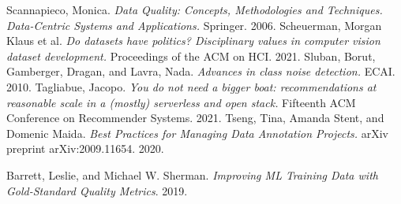 \documentclass[twocolumn]{article}
\begin{document}
\begin{thebibliography}{10}
 Scannapieco, Monica. {\em Data Quality: Concepts, Methodologies and Techniques. Data-Centric Systems and Applications.} Springer. 2006.
 Scheuerman, Morgan Klaus et al. {\em Do datasets have politics? Disciplinary values in computer vision dataset development.} Proceedings of the ACM on HCI. 2021.
 Sluban, Borut, Gamberger, Dragan, and Lavra, Nada. {\em Advances in class noise detection.} ECAI. 2010.
 Tagliabue, Jacopo. {\em You do not need a bigger boat: recommendations at reasonable scale in a (mostly) serverless and open stack.} Fifteenth ACM Conference on Recommender Systems. 2021.
 Tseng, Tina, Amanda Stent, and Domenic Maida. {\em Best Practices for Managing Data Annotation Projects.} arXiv preprint arXiv:2009.11654. 2020.

 Barrett, Leslie, and Michael W. Sherman. {\em Improving ML Training Data with Gold-Standard Quality Metrics}. 2019.
  
\end{thebibliography}
\fi
\end{document}
